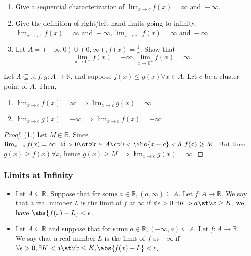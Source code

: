 \documentclass[12pt]{article}
\begin{document}
\begin{example}
  \begin{enumerate}
    \item Give a sequential characterization of $\lim_{x\to c} f(x) = \infty \text{ and } - \infty$.
    \item Give the definition of right/left hand limits going to infinity, $\lim_{x\to c^+} f(x) =  \infty \text{ and }- \infty, \lim_{x\to c^-} f(x) = \infty \text{ and }- \infty$.
    \item Let $A = (-\infty, 0)\cup(0,\infty), f(x) = \frac{1}{x}$. Show that $$\lim_{x\to 0^-} f(x) = -\infty, \lim_{x\to 0^+} f(x) = \infty.$$
  \end{enumerate}
\end{example}

\begin{proposition}\label{prop:orderpropertiesofinfinitelimits}
  Let $A \subseteq \mathbb{R}, f, g: A \to \mathbb{R}$, and suppose $f(x) \leq g(x) \forall x \in A$. Let $c$ be a cluster point of $A$. Then, \begin{enumerate}
    \item $\lim_{x\to c}f(x) = \infty \implies \lim_{x\to c} g(x) = \infty$
    \item $\lim_{x\to c}g(x) = -\infty \implies \lim_{x\to c} f(x) = -\infty$
  \end{enumerate}
\end{proposition}
\begin{proof}(1.) Let $M \in \mathbb{R}$. Since $\lim_{x\to c} f(x) = \infty, \exists \delta>0 \st \forall x \in A \st 0 < \abs{x - c} < \delta, f(x) \geq M$. But then $g(x) \geq f(x) \forall x$, hence $g(x) \geq M \implies \lim_{x\to c} g(x) = \infty$.
\end{proof}

\subsubsection{Limits at Infinity}

\begin{definition}
  \begin{itemize}
    \item Let $A \subseteq \mathbb{R}$. Suppose that for some $a \in \mathbb{R}, (a, \infty) \subseteq A$. Let $f: A \to \mathbb{R}$. We say that a real number $L$ is the limit of $f$ at $\infty$ if $\forall \epsilon > 0$ $\exists K > a \st \forall x \geq K, $ we have $\abs{f(x) - L} < \epsilon$.

    \item Let $A \subseteq \mathbb{R}$ and suppose that for some $a \in \mathbb{R}, (-\infty, a) \subseteq A$. Let $f: A \to \mathbb{R}$. We say that a real number $L$ is the limit of $f$ at $-\infty$ if $\forall \epsilon > 0, \exists K < a \st \forall x \leq K, \abs{f(x) - L} < \epsilon$.
  \end{itemize}
\end{definition}
\end{document}
